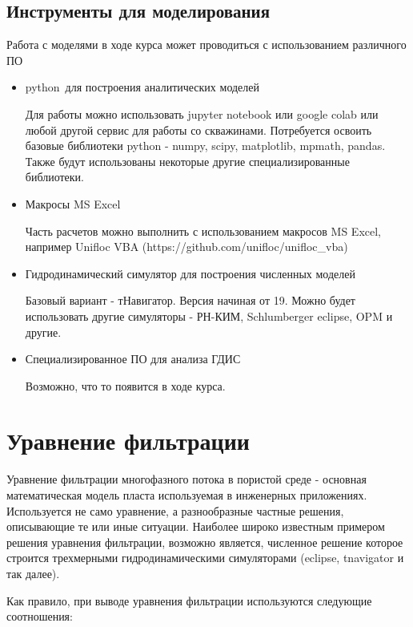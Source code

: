 \documentclass[
  russian,
  letterpaper,
  DIV=11,
  numbers=noendperiod,
  oneside]{scrartcl}
\begin{document}
\subsection{Инструменты для
моделирования}\label{ux438ux43dux441ux442ux440ux443ux43cux435ux43dux442ux44b-ux434ux43bux44f-ux43cux43eux434ux435ux43bux438ux440ux43eux432ux430ux43dux438ux44f}

Работа с моделями в ходе курса может проводиться с использованием
различного ПО

\begin{itemize}
\item
  python~для построения аналитических моделей

  Для работы можно использовать jupyter notebook или google colab или
  любой другой сервис для работы со скважинами. Потребуется освоить
  базовые библиотеки python - numpy, scipy, matplotlib, mpmath, pandas.
  Также будут использованы некоторые другие специализированные
  библиотеки.
\item
  Макросы MS Excel

  Часть расчетов можно выполнить с использованием макросов MS Excel,
  например Unifloc VBA (https://github.com/unifloc/unifloc\_vba)
\item
  Гидродинамический симулятор для построения численных моделей

  Базовый вариант - тНавигатор. Версия начиная от 19. Можно будет
  использовать другие симуляторы - РН-КИМ, Schlumberger eclipse, OPM и
  другие.
\item
  Специализированное ПО для анализа ГДИС

  Возможно, что то появится в ходе курса.
\end{itemize}

\section{Уравнение
фильтрации}\label{ux443ux440ux430ux432ux43dux435ux43dux438ux435-ux444ux438ux43bux44cux442ux440ux430ux446ux438ux438}

Уравнение фильтрации многофазного потока в пористой среде - основная
математическая модель пласта используемая в инженерных приложениях.
Используется не само уравнение, а разнообразные частные решения,
описывающие те или иные ситуации. Наиболее широко известным примером
решения уравнения фильтрации, возможно является, численное решение
которое строится трехмерными гидродинамическими симуляторами (eclipse,
tnavigator и так далее).

Как правило, при выводе уравнения фильтрации используются следующие
соотношения:
\end{document}
